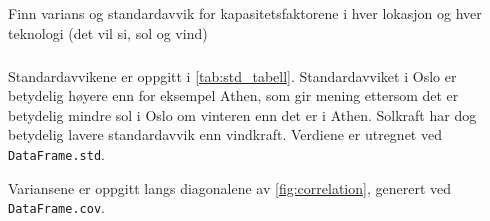 \documentclass{article}
\begin{document}
\newpage
\subsection{}
Finn varians og standardavvik for kapasitetsfaktorene i hver lokasjon og hver teknologi (det vil si, sol og vind)

\subsubsection{}
Standardavvikene er oppgitt i \autoref{tab:std_tabell}.
Standardavviket i Oslo er betydelig høyere enn for eksempel Athen, som gir mening ettersom det er betydelig mindre sol i Oslo om vinteren enn det er i Athen.
Solkraft har dog betydelig lavere standardavvik enn vindkraft. Verdiene er utregnet ved \verb|DataFrame.std|.

\begin{table}[h]
\centering
{}
\qquad
{}
\caption{Standardavvik for kapasitetsfaktorer per lokasjon og teknologi.}
\label{tab:std_tabell}
\end{table}

Variansene er oppgitt langs diagonalene av \autoref{fig:correlation}, generert ved \verb|DataFrame.cov|.
\end{document}
